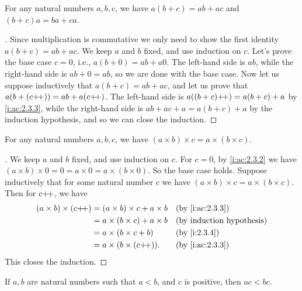 \begin{prop}\label{i:2.3.4}
  For any natural numbers \(a, b, c\), we have \(a(b + c) = ab + ac\) and \((b + c)a = ba + ca\).
\end{prop}

\begin{proof}[]
  Since multiplication is commutative we only need to show the first identity \(a(b + c) = ab + ac\).
  We keep \(a\) and \(b\) fixed, and use induction on \(c\).
  Let's prove the base case \(c = 0\), i.e., \(a(b + 0) = ab + a0\).
  The left-hand side is \(ab\), while the right-hand side is \(ab + 0 = ab\), so we are done with the base case.
  Now let us suppose inductively that \(a(b + c) = ab + ac\), and let us prove that \(a(b + (c{+}\!{+})) = ab + a(c{+}\!{+})\).
  The left-hand side is \(a((b + c){+}\!{+}) = a(b + c) + a\) by \cref{i:ac:2.3.3}, while the right-hand side is \(ab + ac + a = a(b + c) + a\) by the induction hypothesis, and so we can close the induction.
\end{proof}

\begin{prop}\label{i:2.3.5}
  For any natural numbers \(a, b, c\), we have \((a \times b) \times c = a \times (b \times c)\).
\end{prop}

\begin{proof}[]
  We keep \(a\) and \(b\) fixed, and use induction on \(c\).
  For \(c = 0\), by \cref{i:ac:2.3.2} we have \((a \times b) \times 0 = 0 = a \times 0 = a \times (b \times 0)\).
  So the base case holds.
  Suppose inductively that for some natural number \(c\) we have \((a \times b) \times c = a \times (b \times c)\).
  Then for \(c{+}\!{+}\), we have
  \begin{align*}
    (a \times b) \times (c\pp) & = (a \times b) \times c + a \times b &  & \by{i:ac:2.3.3} \\
                               & = a \times (b \times c) + a \times b &  & \byIH           \\
                               & = a \times (b \times c + b)          &  & \by{i:2.3.4}    \\
                               & = a \times (b \times (c\pp)).        &  & \by{i:ac:2.3.3}
  \end{align*}
  This closes the induction.
\end{proof}

\begin{prop}\label{i:2.3.6}
  If \(a, b\) are natural numbers such that \(a < b\), and \(c\) is positive, then \(ac < bc\).
\end{prop}

